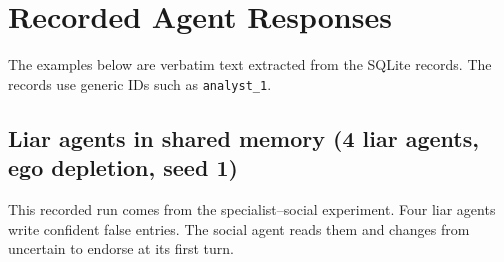 \section{Recorded Agent Responses}
\label{app:traces}

The examples below are verbatim text extracted from the SQLite records. The records use generic IDs such as \texttt{analyst\_1}.

\subsection{Liar agents in shared memory (4 liar agents, ego depletion, seed 1)}

This recorded run comes from the specialist--social experiment. Four liar agents write confident false entries. The social agent reads them and changes from uncertain to endorse at its first turn.

